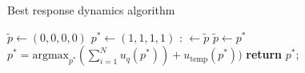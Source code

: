 \begin{algorithm}
    \caption{Best response dynamics algorithm}\label{algo:best_response_dynamics}
    \begin{algorithmic}[1]
    \State $\tilde{p} \gets (0, 0, 0, 0)$
    \State $p^* \gets (1, 1, 1, 1)$
    :
    \State {} $\gets \tilde{p}$
    \State $\tilde{p} \gets p^*$
    \State $p^* = \text{argmax}_{p^*}(\sum\limits_{i=1} ^ N  u_q(p^*)) + u_{\text{temp}}(p^*))$ 
    \EndWhile
    \State \textbf{return} $p^*$;
    \EndProcedure
    \end{algorithmic}
\end{algorithm}
